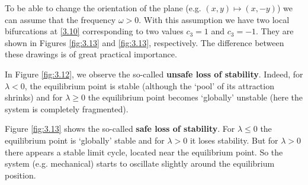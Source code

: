 \begin{remark}
	To be able to change the orientation of the plane (e.g. $(x,y)\longmapsto (x,-y)$) we can assume that the frequency $\omega >0$. With this assumption we have two local bifurcations at \eqref{3.10} corresponding to two values $c_3 = 1$ and $c_3 = -1$. They are shown in Figures \ref{fig:3.13} and \ref{fig:3.13}, respectively. The difference between these drawings is of great practical importance.
	
	In Figure \ref{fig:3.12}, we observe the so-called \textbf{unsafe loss of stability}. Indeed, for $\lambda <0$, the equilibrium point is stable (although the `pool' of its attraction shrinks) and for $\lambda \geq 0$ the equilibrium point becomes `globally' unstable (here the system is completely fragmented).
	
	Figure \ref{fig:3.13} shows the so-called \textbf{safe loss of stability}. For $\lambda \leq 0$ the equilibrium point is `globally' stable and for $\lambda >0$ it loses stability. But for $\lambda >0$ there appears a stable limit cycle, located near the equilibrium point. So the system (e.g. mechanical) starts to oscillate slightly around the equilibrium position.
\end{remark}

